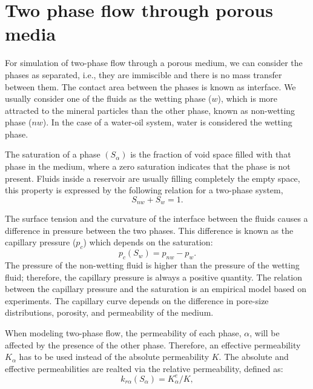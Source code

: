 \documentclass[times,final]{elsarticle}
\begin{document}
\section{Two phase flow through porous media}
\label{sec:1}
\hspace{0.5cm} For simulation of two-phase flow through a porous medium, we can consider the phases as separated, i.e., they are immiscible and there is no mass transfer between them. The contact area between the phases is known as interface. We 
usually consider one of the fluids as the wetting phase ($w$), which is more attracted to the mineral particles than the other phase, known as non-wetting phase ($nw$). In the case of a water-oil system, water is considered
the wetting phase. \par

The saturation of a phase $(S_{\alpha})$ is the fraction of void space filled with that phase in the 
medium, where a zero saturation indicates that the phase is not present.
Fluids inside a reservoir are usually filling completely the empty space, this property is expressed by the following relation for a two-phase system,
\begin{equation}\label{eq:satrel}
 S_{nw}+S_w=1.
\end{equation}\par
The surface tension and the curvature of the interface between the fluids causes a difference in pressure
between the two phases. 
This difference is known as the capillary pressure ($p_c$) which depends on the saturation:
\begin{equation}\label{eq:cappress}
 p_c(S_w)=p_{nw}-p_w.
\end{equation}
The pressure of the non-wetting fluid is higher than the pressure of the wetting fluid; therefore, the capillary pressure is always a positive quantity. 
The relation between the capillary pressure and the saturation is an empirical model based on experiments. 
The capillary curve depends on the difference in pore-size 
distributions, porosity, and permeability of the medium.\par
When modeling two-phase flow, the permeability of each phase, $\alpha$, will be affected by the presence of the other phase. Therefore, an effective permeability $K_\alpha$ has to be used instead of the absolute permeability $K$.  
The absolute and effective permeabilities are realted via the relative permeability, defined as:
\begin{equation}\label{eq:relperm}
    k_{r\alpha}(S_{\alpha})=K_{\alpha}^e/K,
\end{equation}
\end{document}
